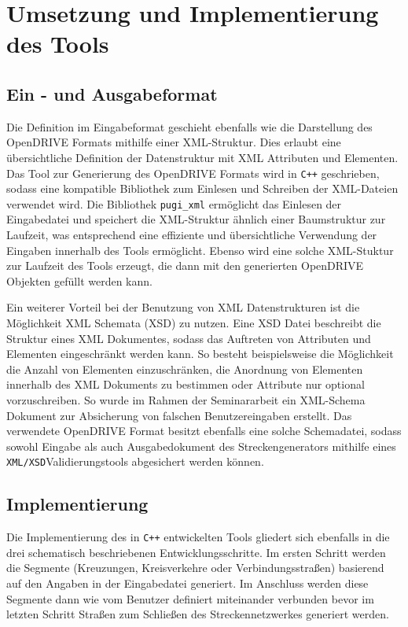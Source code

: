 \chapter{Umsetzung und Implementierung des Tools}

\section{Ein - und Ausgabeformat}
Die Definition im Eingabeformat geschieht ebenfalls wie die Darstellung des OpenDRIVE Formats mithilfe einer XML-Struktur. Dies erlaubt eine übersichtliche Definition der Datenstruktur mit XML Attributen und Elementen. Das Tool zur Generierung des OpenDRIVE Formats wird in \texttt{C++} geschrieben, sodass eine kompatible Bibliothek zum Einlesen und Schreiben der XML-Dateien verwendet wird. Die Bibliothek \texttt{pugi\_xml} ermöglicht das Einlesen der Eingabedatei und speichert die XML-Struktur ähnlich einer Baumstruktur zur Laufzeit, was entsprechend eine effiziente und übersichtliche Verwendung der Eingaben innerhalb des Tools ermöglicht. Ebenso wird eine solche XML-Stuktur zur Laufzeit des Tools erzeugt, die dann mit den generierten OpenDRIVE Objekten gefüllt werden kann.

Ein weiterer Vorteil bei der Benutzung von XML Datenstrukturen ist die Möglichkeit XML Schemata (XSD) zu nutzen. Eine XSD Datei beschreibt die Struktur eines XML Dokumentes, sodass das Auftreten von Attributen und Elementen eingeschränkt werden kann. So besteht beispielsweise die Möglichkeit die Anzahl von Elementen einzuschränken, die Anordnung von Elementen innerhalb des XML Dokuments zu bestimmen oder Attribute nur optional vorzuschreiben. So wurde im Rahmen der Seminararbeit ein XML-Schema Dokument zur Absicherung von falschen Benutzereingaben erstellt. Das verwendete OpenDRIVE Format besitzt ebenfalls eine solche Schemadatei, sodass sowohl Eingabe als auch Ausgabedokument des Streckengenerators mithilfe eines \texttt{XML/XSD}Validierungstools abgesichert werden können.

\section{Implementierung}
Die Implementierung des in \texttt{C++} entwickelten Tools gliedert sich ebenfalls in die drei schematisch beschriebenen Entwicklungsschritte. Im ersten Schritt werden die Segmente (Kreuzungen, Kreisverkehre oder Verbindungsstraßen) basierend auf den Angaben in der Eingabedatei generiert. Im Anschluss werden diese Segmente dann wie vom Benutzer definiert miteinander verbunden bevor im letzten Schritt Straßen zum Schließen des Streckennetzwerkes generiert werden.

